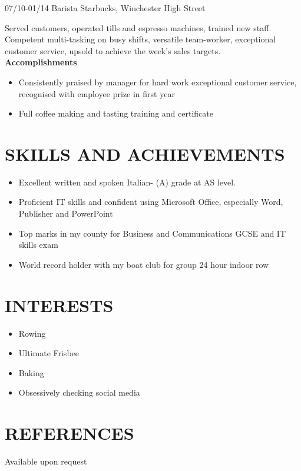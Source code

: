 \documentclass[]{friggeri-cv}
\begin{document}
\begin{entrylist}
  \entry
  {07/10-01/14}
  {Barista}
  {Starbucks, Winchester High Street}
  {Served customers, operated tills and espresso machines, trained new staff. Competent multi-tasking on busy shifts, versatile team-worker, exceptional customer service, upsold to achieve the week’s sales targets. \\
  	\textbf{Accomplishments}
  	\begin{itemize}
  		\item Consistently praised by manager for hard work exceptional customer service, recognised with employee prize in first year
  		\item Full coffee making and tasting training and certificate
  	\end{itemize}
  }
\end{entrylist}

\section{SKILLS AND ACHIEVEMENTS}

\begin{itemize}
	\item Excellent written and spoken Italian- (A) grade at AS level. 
	\item Proficient IT skills and confident using Microsoft Office, especially Word, Publisher and PowerPoint
	\item Top marks in my county for Business and Communications GCSE and IT skills exam 
	\item World record holder with my boat club for group 24 hour indoor row
\end{itemize}

\section{INTERESTS}

\begin{itemize}
	\item Rowing
	\item Ultimate Frisbee
	\item Baking
	\item Obsessively checking social media
\end{itemize}

\section{REFERENCES}

Available upon request
\end{document}
